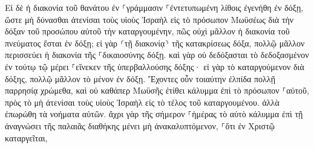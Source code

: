 \documentclass{openreader}
\begin{document}
Εἰ δὲ ἡ διακονία τοῦ θανάτου ἐν ⸀γράμμασιν ⸀ἐντετυπωμένη λίθοις ἐγενήθη ἐν δόξῃ, ὥστε μὴ δύνασθαι ἀτενίσαι τοὺς υἱοὺς Ἰσραὴλ εἰς τὸ πρόσωπον Μωϋσέως διὰ τὴν δόξαν τοῦ προσώπου αὐτοῦ τὴν καταργουμένην, 
πῶς οὐχὶ μᾶλλον ἡ διακονία τοῦ πνεύματος ἔσται ἐν δόξῃ; 
εἰ γὰρ ⸂τῇ διακονίᾳ⸃ τῆς κατακρίσεως δόξα, πολλῷ μᾶλλον περισσεύει ἡ διακονία τῆς ⸀δικαιοσύνης δόξῃ. 
καὶ γὰρ οὐ δεδόξασται τὸ δεδοξασμένον ἐν τούτῳ τῷ μέρει ⸀εἵνεκεν τῆς ὑπερβαλλούσης δόξης· 
εἰ γὰρ τὸ καταργούμενον διὰ δόξης, πολλῷ μᾶλλον τὸ μένον ἐν δόξῃ. 
Ἔχοντες οὖν τοιαύτην ἐλπίδα πολλῇ παρρησίᾳ χρώμεθα, 
καὶ οὐ καθάπερ Μωϋσῆς ἐτίθει κάλυμμα ἐπὶ τὸ πρόσωπον ⸀αὐτοῦ, πρὸς τὸ μὴ ἀτενίσαι τοὺς υἱοὺς Ἰσραὴλ εἰς τὸ τέλος τοῦ καταργουμένου. 
ἀλλὰ ἐπωρώθη τὰ νοήματα αὐτῶν. ἄχρι γὰρ τῆς σήμερον ⸀ἡμέρας τὸ αὐτὸ κάλυμμα ἐπὶ τῇ ἀναγνώσει τῆς παλαιᾶς διαθήκης μένει μὴ ἀνακαλυπτόμενον, ⸀ὅτι ἐν Χριστῷ καταργεῖται, 
\end{document}
